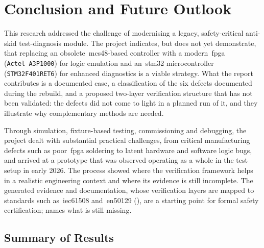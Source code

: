 \chapter{Conclusion and Future Outlook}
\label{chap:conclusion}

This research addressed the challenge of modernising a legacy, safety-critical anti-skid test-diagnosis module. The project indicates, but does not yet demonstrate, that replacing an obsolete~\gls{mcs48}-based controller with a modern~\gls{fpga} (\texttt{Actel~A3P1000}) for logic emulation and an~\gls{stm32} microcontroller (\texttt{STM32F401RET6}) for enhanced diagnostics is a viable strategy. What the report contributes is a documented case, a classification of the six defects documented during the rebuild, and a proposed two-layer verification structure that has not been validated: the defects did not come to light in a planned run of it, and they illustrate why complementary methods are needed.

Through simulation, fixture-based testing, commissioning and debugging, the project dealt with substantial practical challenges, from critical manufacturing defects such as poor~\gls{fpga} soldering to latent hardware and software logic bugs, and arrived at a prototype that was observed operating as a whole in the test setup in early 2026. The process showed where the verification framework helps in a realistic engineering context and where its evidence is still incomplete. The generated evidence and documentation, whose verification layers are mapped to standards such as~\gls{iec61508} and~\gls{en50129} (), are a starting point for formal safety certification;  names what is still missing.

\section{Summary of Results}
\label{sec:achievements}

